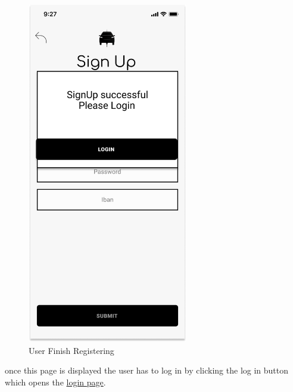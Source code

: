 \begin{figure}[H]
    \centering
    \includegraphics[keepaspectratio, height=15cm]{Mockup/CPOAppInterface/RegisterConfirmation.png}
    \caption{User Finish Registering}
    \label{site:ConfirmReg}
\end{figure}
once this page is displayed the user has to log in by clicking the log in button which opens the \hyperref[site:Login]{login page}.
